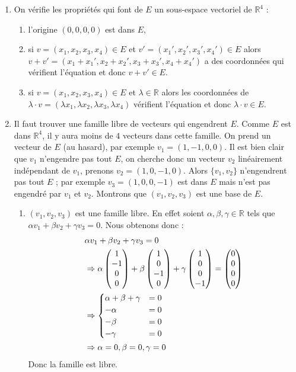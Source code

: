 \documentclass[11pt,a4paper]{article}
\newcommand{\Rr}{\mathbb{R}} \newcommand{\R}{\mathbb{R}}
\begin{document}
\begin{enumerate}
\item On v\'erifie les propri\'et\'es qui font de $E$ un sous-espace
  vectoriel de $\Rr^4$ : 
  \begin{enumerate}
    \item l'origine $(0,0,0,0)$ est dans $E$,
    \item si $v=(x_1,x_2,x_3,x_4) \in E$ et $v'=(x_1',x_2',x_3',x_4')\in E$ alors $v+v'=(x_1+x_1',x_2+x_2',x_3+x_3',x_4+x_4')$
a des coordonnées qui vérifient l'équation et donc $v+v' \in E$.
    \item si $v=(x_1,x_2,x_3,x_4) \in E$ et $\lambda \in \Rr$ alors les coordonnées de 
$\lambda\cdot v = (\lambda x_1,\lambda x_2,\lambda x_3,\lambda x_4)$ vérifient 
l'équation et donc $\lambda \cdot v \in E$.
  \end{enumerate}

\item Il faut trouver une famille libre de vecteurs qui engendrent
  $E$. Comme $E$ est dans $\Rr^4$, il y aura moins de $4$ vecteurs
  dans cette famille. On prend un vecteur de $E$ (au hasard), par
  exemple $v_1 = (1,-1,0,0)$. Il est bien clair que $v_1$ n'engendre
  pas tout $E$, on cherche donc un vecteur $v_2$ lin\'eairement
  ind\'ependant de $v_1$, prenons $v_2 = (1,0,-1,0)$. Alors $\{v_1,v_2\}$
  n'engendrent pas tout $E$ ; par exemple $v_3 = (1,0,0,-1)$ est dans $E$
  mais n'est pas engendr\'e par $v_1$ et $v_2$. Montrons que
  $(v_1,v_2,v_3)$ est une base de $E$.
  \begin{enumerate}
  \item $(v_1,v_2,v_3)$ est une famille libre. En effet soient
    $\alpha,\beta,\gamma \in \Rr$ tels que $\alpha v_1+\beta
    v_2+\gamma v_3=0$. Nous obtenons donc :
\begin{align*}
& \alpha v_1+\beta v_2+\gamma v_3=0 \\
&\Rightarrow \alpha \begin{pmatrix}1 \cr -1 \cr 0 \cr 0 \cr
\end{pmatrix} + \beta
 \begin{pmatrix}1 \cr 0 \cr -1 \cr 0 \cr \end{pmatrix} + \gamma 
\begin{pmatrix}1 \cr 0 \cr 0 \cr -1 \cr \end{pmatrix}= 
\begin{pmatrix}0 \cr 0 \cr 0 \cr 0 \cr \end{pmatrix} \\
 &\Rightarrow \begin{cases}
  \alpha+\beta +\gamma &= 0 \\
  -\alpha &= 0 \\
  -\beta &=  0 \\
  -\gamma &=  0 \\
\end{cases}\\
 &\Rightarrow \alpha=0, \beta=0, \gamma = 0 \\
\end{align*}
Donc la famille est libre.


\end{enumerate}
\end{enumerate}
\end{document}
